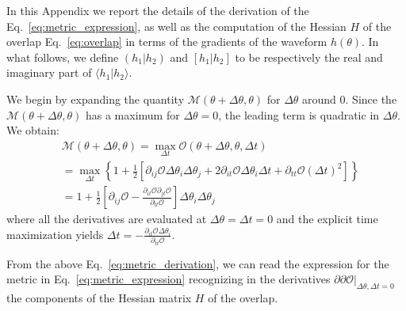 \documentclass[twocolumn,showpacs,preprintnumbers,nofootinbib,prd,
superscriptaddress,10pt]{revtex4-2}
\newcommand{\scalar}[2]{\langle #1|#2 \rangle}
\newcommand{\rescalar}[2]{( #1 |#2 )}
\newcommand{\imscalar}[2]{[ #1|#2 ]}
\begin{document}
In this Appendix we report the details of the derivation of the Eq.~\eqref{eq:metric_expression}, as well as the computation of the Hessian $H$ of the overlap Eq.~\eqref{eq:overlap} in terms of the gradients of the waveform $h(\theta)$. 
In what follows, we define $\rescalar{h_1}{h_2}$ and $\imscalar{h_1}{h_2}$ to be respectively the real and imaginary part of $\scalar{h_1}{h_2}$.

We begin by expanding the quantity $\mathcal{M}(\theta+\Delta\theta,\theta )$ for $\Delta\theta$ around $0$. Since the $\mathcal{M}(\theta+\Delta\theta,\theta )$ has a maximum for $\Delta\theta = 0$, the leading term is quadratic in $\Delta\theta$.
We obtain:
\begin{align} \label{eq:metric_derivation}
	&\mathcal{M}(\theta+\Delta\theta,\theta ) = \max_{\Delta t} \mathcal{O}(\theta + \Delta\theta, \theta, \Delta t) \nonumber\\
	& =	\max_{\Delta t} \left\{ 1+ \frac{1}{2}\left[ \partial_{ij}\mathcal{O} \Delta\theta_i \Delta\theta_j + 2  \partial_{it}\mathcal{O} \Delta\theta_i \Delta t + \partial_{tt}\mathcal{O} (\Delta t)^2 \right] \right\}  \nonumber \\
	&= 1 + \frac{1}{2}\left[ \partial_{ij}\mathcal{O} - \frac{\partial_{it}\mathcal{O} \partial_{jt}\mathcal{O}}{\partial_{tt}\mathcal{O}}\right] \Delta\theta_i \Delta\theta_j
\end{align}
where all the derivatives are evaluated at ${\Delta\theta = \Delta t = 0}$ and the explicit time maximization yields
${\Delta t = -\frac{\partial_{it}\mathcal{O} \Delta\theta_i}{\partial_{tt}\mathcal{O}}}$.

From the above Eq.~\eqref{eq:metric_derivation}, we can read the expression for the metric in Eq.~\eqref{eq:metric_expression} recognizing in the derivatives $\partial\partial\mathcal{O}|_{\Delta\theta, \Delta t = 0}$ the components of the Hessian matrix $H$ of the overlap.
\end{document}
